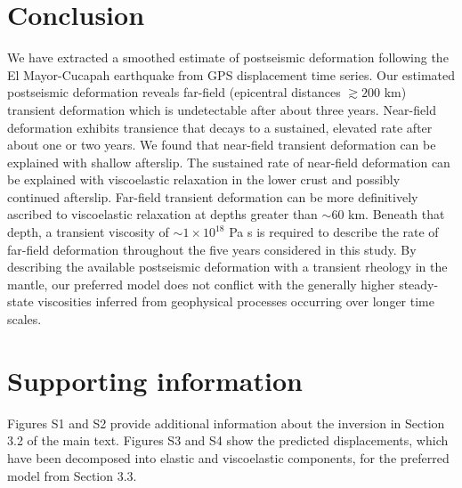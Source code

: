 \section{Conclusion}
We have extracted a smoothed estimate of postseismic deformation following the El Mayor-Cucapah earthquake from GPS displacement time series.  Our estimated postseismic deformation reveals far-field (epicentral distances ${\gtrsim}200$ km) transient deformation which is undetectable after about three years. Near-field deformation exhibits transience that decays to a sustained, elevated rate after about one or two years.  We found that near-field transient deformation can be explained with shallow afterslip.  The sustained rate of near-field deformation can be explained with viscoelastic relaxation in the lower crust and possibly continued afterslip.  Far-field transient deformation can be more definitively ascribed to viscoelastic relaxation at depths greater than ${\sim}60$ km. Beneath that depth, a transient viscosity of ${\sim}1\times10^{18}$ Pa s is required to describe the rate of far-field deformation throughout the five years considered in this study.  By describing the available postseismic deformation with a transient rheology in the mantle, our preferred model does not conflict with the generally higher steady-state viscosities inferred from geophysical processes occurring over longer time scales.

\section{Supporting information}
Figures S1 and S2 provide additional information about the inversion in Section 3.2 of the main  
text. Figures S3 and S4 show the predicted displacements, which have been decomposed into
elastic and viscoelastic components, for the preferred model from Section 3.3.


